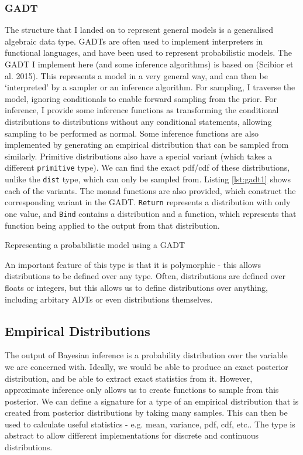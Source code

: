 \subsubsection{GADT} \label{sec:gadt}
The structure that I landed on to represent general models is a generalised algebraic data type. GADTs are often used to implement interpreters in functional languages, and have been used to represent probabilistic models. The GADT I implement here (and some inference algorithms) is based on (Scibior et al. 2015)\cite{scibior2015practical}. This represents a model in a very general way, and can then be `interpreted' by a sampler or an inference algorithm. For sampling, I traverse the model, ignoring conditionals to enable forward sampling from the prior. For inference, I provide some inference functions as transforming the conditional distributions to distributions without any conditional statements, allowing sampling to be performed as normal. Some inference functions are also implemented by generating an empirical distribution that can be sampled from similarly. Primitive distributions also have a special variant (which takes a different \texttt{primitive} type). We can find the exact pdf/cdf of these distributions, unlike the \texttt{dist} type, which can only be sampled from. Listing \ref{lst:gadt1} shows each of the variants. The monad functions are also provided, which construct the corresponding variant in the GADT. \texttt{Return} represents a distribution with only one value, and \texttt{Bind} contains a distribution and a function, which represents that function being applied to the output from that distribution.

\begin{listing}[!ht]
	\caption{Representing a probabilistic model using a GADT}
	\label{lst:gadt1}
\end{listing}

An important feature of this type is that it is polymorphic - this allows distributions to be defined over any type. Often, distributions are defined over floats or integers, but this allows us to define distributions over anything, including arbitary ADTs or even distributions themselves.

\subsection{Empirical Distributions}

The output of Bayesian inference is a probability distribution over the variable we are concerned with. Ideally, we would be able to produce an exact posterior distribution, and be able to extract exact statistics from it. However, approximate inference only allows us to create functions to sample from this posterior. We can define a signature for a type of an empirical distribution that is created from posterior distributions by taking many samples. This can then be used to calculate useful statistics - e.g. mean, variance, pdf, cdf, etc.. The type is abstract to allow different implementations for discrete and continuous distributions. 
	
